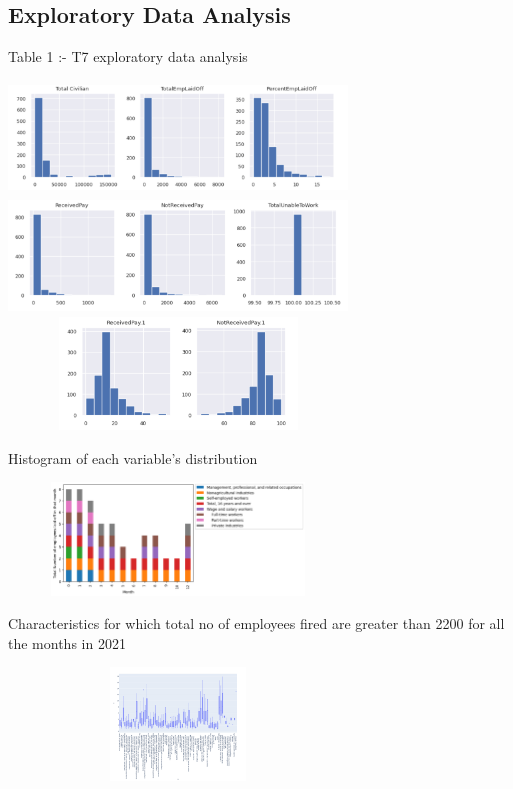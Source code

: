\documentclass[fleqn,10pt]{SelfArx} %
\begin{document}
\subsection{Exploratory Data Analysis}

{Table 1 :- T7 exploratory data analysis}

\begin{center}
    \includegraphics[width=9cm, height=3cm]{t7_hist_1.png}
    \includegraphics[width=9cm, height=3cm]{t7_hist_2.png}
    \includegraphics[width=9cm, height=3cm]{t7_hist_3.png}
\end{center}

Histogram of each variable's distribution

\includegraphics[width=9cm, height=3cm]{dmph1.png}

Characteristics for which total no of employees fired are greater than 2200 for all the months in 2021

\includegraphics[width=9cm, height=3cm]{characteristic vs percent laid off.png}
\end{document}
